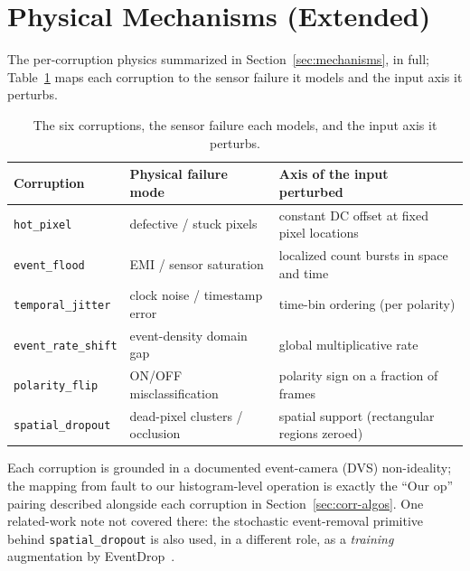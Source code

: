 ﻿\documentclass{article} %
\theoremstyle{remark}
\begin{document}
\section{Physical Mechanisms (Extended)}
\label{app:mechanisms}
The per-corruption physics summarized in Section~\ref{sec:mechanisms}, in full;
Table~\ref{tab:corr-taxonomy} maps each corruption to the sensor failure it models and the input
axis it perturbs.

\begin{table}[t]
  \centering\small
  \caption{The six corruptions, the sensor failure each models, and the input axis it perturbs.}
  \label{tab:corr-taxonomy}
  \begin{tabularx}{\linewidth}{@{}l l X@{}}
    \toprule
    Corruption & Physical failure mode & Axis of the input perturbed \\
    \midrule
    \texttt{hot\_pixel}        & defective / stuck pixels        & constant DC offset at fixed pixel locations \\
    \texttt{event\_flood}      & EMI / sensor saturation         & localized count bursts in space and time \\
    \texttt{temporal\_jitter}  & clock noise / timestamp error   & time-bin ordering (per polarity) \\
    \texttt{event\_rate\_shift}& event-density domain gap        & global multiplicative rate \\
    \texttt{polarity\_flip}    & ON/OFF misclassification         & polarity sign on a fraction of frames \\
    \texttt{spatial\_dropout}  & dead-pixel clusters / occlusion & spatial support (rectangular regions zeroed) \\
    \bottomrule
  \end{tabularx}
\end{table}
Each corruption is grounded in a documented event-camera (DVS) non-ideality; the mapping from fault
to our histogram-level operation is exactly the ``Our op'' pairing described alongside each corruption
in Section~\ref{sec:corr-algos}. One related-work note not covered there: the stochastic event-removal
primitive behind \texttt{spatial\_dropout} is also used, in a different role, as a \emph{training}
augmentation by EventDrop~\citep{gu2021eventdrop}.
\end{document}

